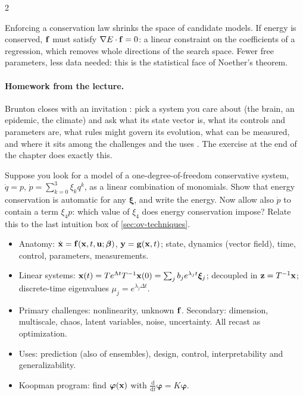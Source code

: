 \begin{paracol}{2}
\begin{intuition}
Enforcing a conservation law shrinks the space of candidate models. If energy is conserved, $\mathbf{f}$
must satisfy $\nabla E\cdot\mathbf{f}=0$: a linear constraint on the coefficients of a regression, which
removes whole directions of the search space. Fewer free parameters, less data needed: this is the
statistical face of Noether's theorem.
\end{intuition}

\paragraph{Homework from the lecture.} Brunton closes with an invitation : pick a system
you care about (the brain, an epidemic, the climate) and ask what its state vector is, what its
controls and parameters are, what rules might govern its evolution, what can be measured, and where it
sits among the challenges and the uses . The exercise at the end of the chapter does exactly this.

\begin{exercise}
Suppose you look for a model of a one-degree-of-freedom conservative system, $\dot q=p$,
$\dot p=\sum_{k=0}^{3}\xi_kq^k$, as a linear combination of monomials. Show that energy conservation is
automatic for any $\boldsymbol\xi$, and write the energy. Now allow also $\dot p$ to contain a term
$\xi_4p$: which value of $\xi_4$ does energy conservation impose? Relate this to the last intuition box
of \cref{sec:ov-techniques}.
\end{exercise}

\begin{keyformulas}
\begin{itemize}
  \item Anatomy: $\dot{\mathbf{x}}=\mathbf{f}(\mathbf{x},t,\mathbf{u};\boldsymbol\beta)$, $\mathbf{y}=\mathbf{g}(\mathbf{x},t)$; state,
        dynamics (vector field), time, control, parameters, measurements.
  \item Linear systems: $\mathbf{x}(t)=Te^{\Lambda t}T^{-1}\mathbf{x}(0)=\sum_j b_je^{\lambda_jt}\boldsymbol\xi_j$;
        decoupled in $\mathbf{z}=T^{-1}\mathbf{x}$; discrete-time eigenvalues $\mu_j=e^{\lambda_j\Delta t}$.
  \item Primary challenges: nonlinearity, unknown $\mathbf{f}$. Secondary: dimension, multiscale, chaos,
        latent variables, noise, uncertainty. All recast as optimization.
  \item Uses: prediction (also of ensembles), design, control, interpretability and generalizability.
  \item Koopman program: find $\boldsymbol\varphi(\mathbf{x})$ with $\tfrac{\mathrm d}{\mathrm dt}\boldsymbol\varphi=K\boldsymbol\varphi$.
\end{itemize}
\end{keyformulas}


\end{paracol}

